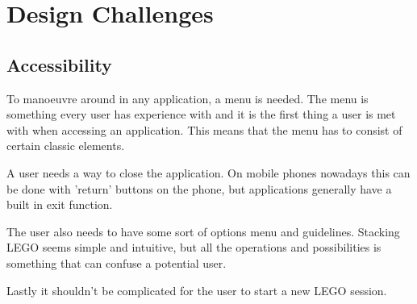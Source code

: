 
\section{Design Challenges}
\subsection{Accessibility}
To manoeuvre around in any application, a menu is needed. The menu is something every user has experience with and it is the first thing a user is met with when accessing an application. This means that the menu has to consist of certain classic elements.\par A user needs a way to close the application. On mobile phones nowadays this can be done with 'return' buttons on the phone, but applications generally have a built in exit function.\par
The user also needs to have some sort of options menu and guidelines. Stacking LEGO seems simple and intuitive, but all the operations and possibilities is something that can confuse a potential user. \par
Lastly it shouldn't be complicated for the user to start a new LEGO session.

